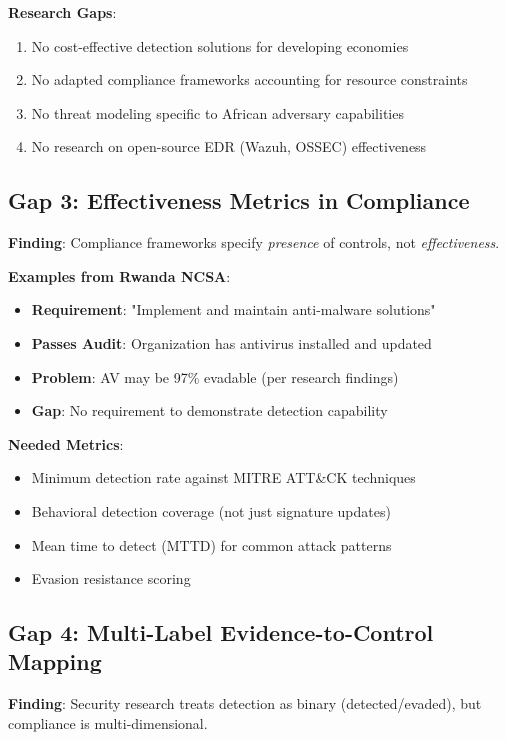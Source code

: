 \documentclass[11pt,conference]{IEEEtran}
\begin{document}
\textbf{Research Gaps}:
\begin{enumerate}
    \item No cost-effective detection solutions for developing economies
    \item No adapted compliance frameworks accounting for resource constraints
    \item No threat modeling specific to African adversary capabilities
    \item No research on open-source EDR (Wazuh, OSSEC) effectiveness
\end{enumerate}

\subsection{Gap 3: Effectiveness Metrics in Compliance}

\textbf{Finding}: Compliance frameworks specify \textit{presence} of controls, not \textit{effectiveness}.

\textbf{Examples from Rwanda NCSA}:
\begin{itemize}
    \item \textbf{Requirement}: "Implement and maintain anti-malware solutions"
    \item \textbf{Passes Audit}: Organization has antivirus installed and updated
    \item \textbf{Problem}: AV may be 97\% evadable (per research findings)
    \item \textbf{Gap}: No requirement to demonstrate detection capability
\end{itemize}

\textbf{Needed Metrics}:
\begin{itemize}
    \item Minimum detection rate against MITRE ATT\&CK techniques
    \item Behavioral detection coverage (not just signature updates)
    \item Mean time to detect (MTTD) for common attack patterns
    \item Evasion resistance scoring
\end{itemize}

\subsection{Gap 4: Multi-Label Evidence-to-Control Mapping}

\textbf{Finding}: Security research treats detection as binary (detected/evaded), but compliance is multi-dimensional.
\end{document}
